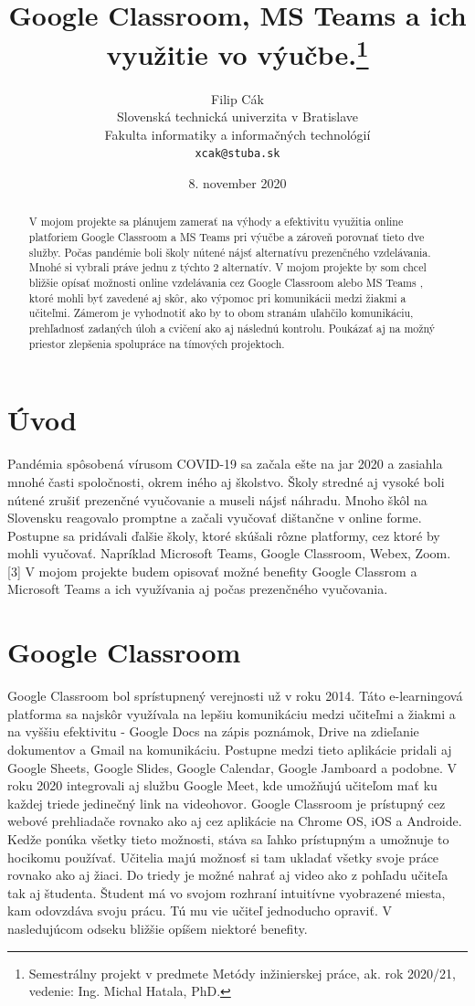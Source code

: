 \documentclass[10pt,slovak,a4paper]{article}
\title{Google Classroom,  MS Teams a ich využitie vo výučbe.\thanks{Semestrálny projekt v predmete Metódy inžinierskej práce, ak. rok 2020/21, vedenie: Ing. Michal Hatala, PhD. }}
\author{Filip Cák\\[2pt]
	{\small Slovenská technická univerzita v Bratislave}\\
	{\small Fakulta informatiky a informačných technológií}\\
	{\small \texttt{xcak@stuba.sk}}
	}
\date{\small 8. november 2020}
\begin{document}
\maketitle

\begin{abstract}
V mojom projekte sa plánujem zamerať na výhody a efektivitu využitia online platforiem Google Classroom a MS Teams pri výučbe a zároveň porovnať tieto dve služby. Počas pandémie boli školy nútené nájsť alternatívu prezenčného vzdelávania. Mnohé si vybrali práve jednu z týchto 2 alternatív. \cite {COVID-19clanok} V mojom projekte by som chcel bližšie opísať možnosti online vzdelávania cez Google Classroom alebo MS Teams \cite {porovnanie}, ktoré mohli byť zavedené aj skôr, ako výpomoc pri komunikácii medzi žiakmi a učiteľmi. Zámerom je vyhodnotiť ako by to obom stranám uľahčilo komunikáciu, prehľadnosť zadaných úloh a cvičení ako aj následnú kontrolu. Poukázať aj na možný priestor zlepšenia spolupráce na tímových projektoch.
\end{abstract}



\section{Úvod}
Pandémia spôsobená vírusom COVID-19 sa začala ešte na jar 2020 a zasiahla mnohé časti spoločnosti, okrem iného aj školstvo. Školy stredné aj vysoké boli nútené zrušiť prezenčné vyučovanie a museli nájsť náhradu. Mnoho škôl na Slovensku reagovalo promptne a začali vyučovať dištančne v online forme. Postupne sa pridávali ďalšie školy, ktoré skúšali rôzne platformy, cez ktoré by mohli vyučovať. Napríklad Microsoft Teams, Google Classroom, Webex, Zoom. [3] V mojom projekte budem opisovať možné benefity Google Classrom a Microsoft Teams a ich využívania aj počas prezenčného vyučovania. 

\section{Google Classroom} \label{Google Classroom}

Google Classroom bol sprístupnený verejnosti už v roku 2014. \cite {release_date} Táto e-learningová platforma sa najskôr využívala na lepšiu komunikáciu medzi učiteľmi a žiakmi a na vyššiu efektivitu - Google Docs na zápis poznámok, Drive na zdieľanie dokumentov a Gmail na komunikáciu. Postupne medzi tieto aplikácie pridali aj Google Sheets, Google Slides, Google Calendar, Google Jamboard a podobne. V roku 2020 integrovali aj službu Google Meet, kde umožňujú učiteľom mať ku každej triede jedinečný link na videohovor. Google Classroom je prístupný cez webové prehliadače rovnako ako aj cez aplikácie na Chrome OS, iOS a Androide. Kedže ponúka všetky tieto možnosti, stáva sa ľahko prístupným a umožnuje to hocikomu používať. \cite {COVID-19clanok} Učitelia majú možnosť si tam ukladať všetky svoje práce rovnako ako aj žiaci. Do triedy je možné nahrať aj video ako z pohľadu učiteľa tak aj študenta. Študent má vo svojom rozhraní intuitívne vyobrazené miesta, kam odovzdáva svoju prácu. Tú mu vie učiteľ jednoducho opraviť. V nasledujúcom odseku bližšie opíšem niektoré benefity.
\end{document}
